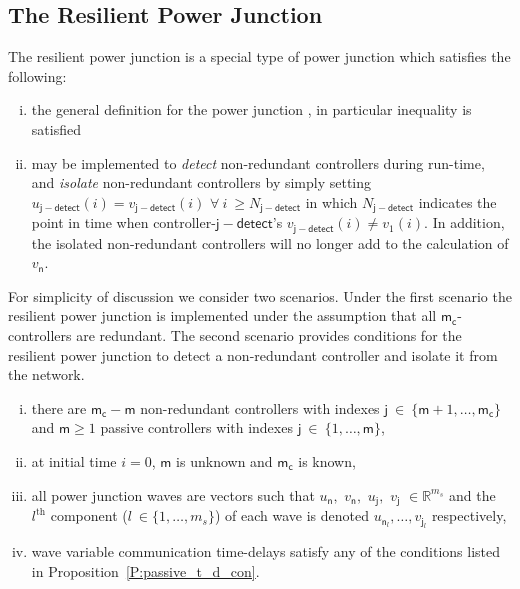 \subsection{The Resilient Power Junction}
\label{S:res_pj}
The resilient power junction is a special type of power junction which
satisfies the following:
\begin{enumerate}[i)]
\item the general definition for the power junction
  \cite[Definition~1]{kottenstette08:_contr_of_multip_networ_passiv},
  in particular inequality  is satisfied
\item may be implemented to {\em detect} non-redundant controllers
  during run-time, and {\em isolate}  non-redundant controllers by
  simply setting $u_{\mathsf{j-detect}}(i) = v_{\mathsf{j-detect}}(i)$ $\forall\ i\ \geq
  N_{\mathsf{j-detect}}$ in which $N_{\mathsf{j-detect}}$ indicates
  the point in time when controller-$\mathsf{j-detect}$'s
  $v_{\mathsf{j-detect}}(i) \neq v_{1}(i)$.  In addition, the isolated non-redundant
  controllers will no longer add to the calculation of $v_{\mathsf{n}}$.
\end{enumerate}
For simplicity of discussion we consider two scenarios.  Under the
first scenario the resilient power junction is implemented under the
assumption that all $\mathsf{m_c}$-controllers are redundant.  The
second 
scenario provides conditions for the resilient power junction to
detect a non-redundant controller and isolate it from the network.
\begin{assumption}
\label{A:resilient_pj}
\begin{enumerate}[i)]
\item there are $\mathsf{m_c}-\mathsf{m}$ non-redundant controllers with
  indexes $\mathsf{j}\ \in\ \{\mathsf{m}+1,\dots,\mathsf{m_c}\}$ and
  $\mathsf{m} \geq 1$ passive controllers with indexes $\mathsf{j}\
  \in\ \{1,\dots,\mathsf{m}\}$,
\item at initial time $i=0$, $\mathsf{m}$ is unknown and
  $\mathsf{m_c}$ is known,
\item all power junction waves are vectors such that $u_{\mathsf{n}},$
  $v_{\mathsf{n}},$ $u_{\mathsf{j}},$ $v_{\mathsf{j}}$ $\in
  \mathbb{R}^{m_s}$ and the $l^{\mathrm{th}}$ component ($l\ \in
  \{1,\dots,m_s\}$) of each wave is denoted $u_{\mathsf{n}_l},\dots,
  v_{\mathsf{j}_l}$ respectively, 
\item wave variable communication time-delays satisfy
any of the conditions listed in Proposition~\ref{P:passive_t_d_con}.
\end{enumerate}
\end{assumption}
